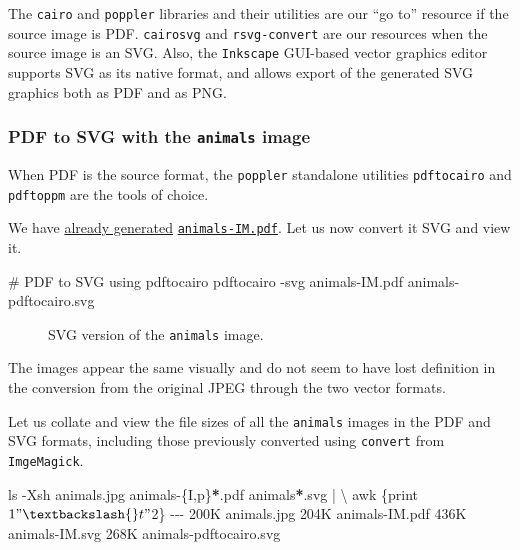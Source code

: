 \documentclass[
  a4paper,
]{article}
\newenvironment{Shaded}{\begin{snugshade}}{\end{snugshade}}
\newcommand{\AttributeTok}[1]{\textcolor[rgb]{0.80,0.80,0.80}{#1}}
\newcommand{\CommentTok}[1]{\textcolor[rgb]{0.50,0.62,0.50}{#1}}
\newcommand{\DataTypeTok}[1]{\textcolor[rgb]{0.87,0.87,0.75}{#1}}
\newcommand{\ExtensionTok}[1]{\textcolor[rgb]{0.80,0.80,0.80}{#1}}
\newcommand{\FunctionTok}[1]{\textcolor[rgb]{0.94,0.94,0.56}{#1}}
\newcommand{\KeywordTok}[1]{\textcolor[rgb]{0.94,0.87,0.69}{#1}}
\newcommand{\NormalTok}[1]{\textcolor[rgb]{0.80,0.80,0.80}{#1}}
\newcommand{\OperatorTok}[1]{\textcolor[rgb]{0.94,0.94,0.82}{#1}}
\newcommand{\PreprocessorTok}[1]{\textcolor[rgb]{1.00,0.81,0.69}{\textbf{#1}}}
\newcommand{\StringTok}[1]{\textcolor[rgb]{0.80,0.58,0.58}{#1}}
\begin{document}
The \texttt{cairo} and \texttt{poppler} libraries and their utilities
are our ``go to'' resource if the source image is PDF. \texttt{cairosvg}
and \texttt{rsvg-convert} are our resources when the source image is an
SVG. Also, the \texttt{Inkscape} GUI-based vector graphics editor
supports SVG as its native format, and allows export of the generated
SVG graphics both as PDF and as PNG.

\hypertarget{pdf-to-svg-with-the-animals-image}{%
\subsubsection{\texorpdfstring{PDF to SVG with the \texttt{animals}
image}{PDF to SVG with the animals image}}\label{pdf-to-svg-with-the-animals-image}}

When PDF is the source format, the \texttt{poppler} standalone utilities
\texttt{pdftocairo} and \texttt{pdftoppm} are the tools of choice.

We have
\protect\hyperlink{raster-to-pdf-with-convert-for-animals}{already
generated} \href{images/animals-IM.pdf}{\texttt{animals-IM.pdf}}. Let us
now convert it SVG and view it.

\begin{Shaded}
\begin{Highlighting}[]
\CommentTok{\# PDF to SVG using pdftocairo}
\ExtensionTok{pdftocairo} \AttributeTok{{-}svg}\NormalTok{ animals{-}IM.pdf animals{-}pdftocairo.svg}
\end{Highlighting}
\end{Shaded}

\begin{figure}
\hypertarget{fig:animals-pdftocairo-svg}{%
\centering

\caption{SVG version of the \texttt{animals}
image.}\label{fig:animals-pdftocairo-svg}
}
\end{figure}

The images appear the same visually and do not seem to have lost
definition in the conversion from the original JPEG through the two
vector formats.

Let us collate and view the file sizes of all the \texttt{animals}
images in the PDF and SVG formats, including those previously converted
using \texttt{convert} from \texttt{ImgeMagick}.

\begin{Shaded}
\begin{Highlighting}[]
\FunctionTok{ls} \AttributeTok{{-}Xsh}\NormalTok{ animals.jpg animals{-}}\DataTypeTok{\{I}\OperatorTok{,}\DataTypeTok{p\}}\PreprocessorTok{*}\NormalTok{.pdf animals}\PreprocessorTok{*}\NormalTok{.svg }\KeywordTok{|} \DataTypeTok{\textbackslash{}}
\FunctionTok{awk} \StringTok{\textquotesingle{}\{print $1 "\textbackslash{}t" $2\}\textquotesingle{}}
\ExtensionTok{{-}{-}{-}}
\ExtensionTok{200K}\NormalTok{    animals.jpg}
\ExtensionTok{204K}\NormalTok{    animals{-}IM.pdf}
\ExtensionTok{436K}\NormalTok{    animals{-}IM.svg}
\ExtensionTok{268K}\NormalTok{    animals{-}pdftocairo.svg}
\end{Highlighting}
\end{Shaded}
\end{document}
